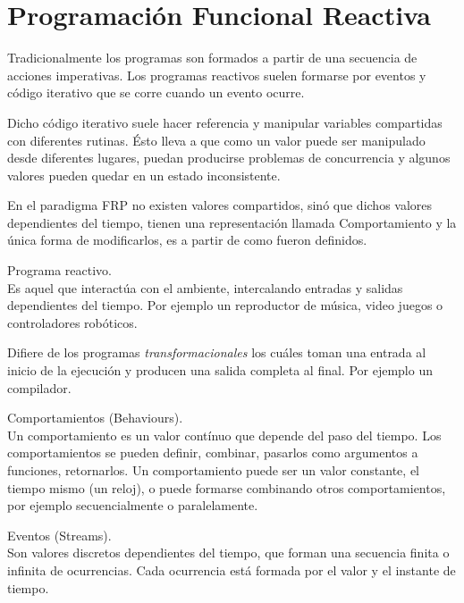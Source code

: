 



\section{Programación Funcional Reactiva}

Tradicionalmente los programas son formados a partir de
una secuencia de acciones imperativas. Los programas
reactivos suelen formarse por eventos y código iterativo
que se corre cuando un evento ocurre.

Dicho código iterativo suele hacer referencia y manipular
variables compartidas con diferentes rutinas. Ésto lleva a que
como un valor puede ser manipulado desde diferentes lugares,
puedan producirse problemas de concurrencia y algunos valores
pueden quedar en un estado inconsistente.

En el paradigma FRP no existen valores compartidos, sinó que
dichos valores dependientes del tiempo, tienen una representación
llamada Comportamiento y la única forma de modificarlos, es
a partir de como fueron definidos.

\begin{definicion}
Programa reactivo.\\
Es aquel que interactúa con el ambiente, intercalando entradas
y salidas dependientes del tiempo. Por ejemplo un reproductor
de música, video juegos o controladores robóticos.

Difiere de los programas \emph{transformacionales} los cuáles
toman una entrada al inicio de la ejecución y producen una salida
completa al final. Por ejemplo un compilador.
\end{definicion}

\begin{definicion}
Comportamientos (Behaviours).\\
Un comportamiento es un valor contínuo que depende del paso del tiempo.
Los comportamientos se pueden definir, combinar, pasarlos como
argumentos a funciones, retornarlos.
Un comportamiento puede ser un valor constante, el tiempo mismo (un reloj),
o puede formarse combinando otros comportamientos, por ejemplo secuencialmente
o paralelamente.
\end{definicion}

\begin{definicion}
Eventos (Streams).\\
Son valores discretos dependientes del tiempo, que forman
una secuencia finita o infinita de ocurrencias. Cada ocurrencia
está formada por el valor y el instante de tiempo.
\end{definicion}

